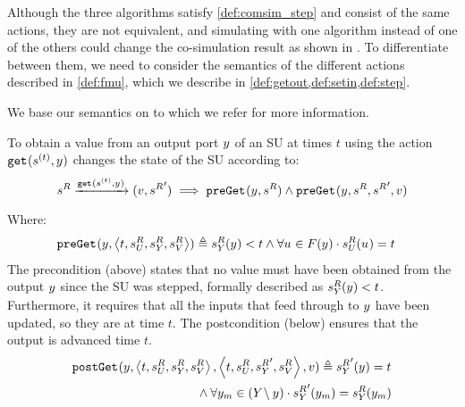 Although the three algorithms satisfy \cref{def:comsim_step} and consist of the same actions, they are not equivalent, and simulating with one algorithm instead of one of the others could change the co-simulation result as shown in \cite{Gomes2019c,hansen_verification_2021}. 
To differentiate between them, we need to consider the semantics of the different actions described in \cref{def:fmu}, which we describe in \cref{def:getout,def:setin,def:step}.

We base our semantics on \cite{Gomes2019a,hansen_verification_2021} to which we refer for more information.

\begin{definition}\label{def:getout}   
  To obtain a value from an output port $y_{}$ of an SU at times $t$ using the action $\mathtt{get}_{}(s_{}^{(t)},y_{})$ changes the state of the SU according to:
  \begin{align*}
    s^{R}_{} 
    \xrightarrow[\text{}]{\mathtt{get}_{}(s_{}^{(t)}, y_{})} 
    (v,{s^{R}_{}}')
    \implies 
    \mathtt{preGet}_{}(y_{}, s^{R}_{})
    \land
    \mathtt{preGet}_{}(y_{}, s^{R}_{}, {s^{R}_{}}', v)
  \end{align*}
  Where:
  \begin{align*}
    &\mathtt{preGet}_{}(y_{},  \left\langle t,s^{R}_{U_{}}, s^{R}_{Y_{}}, s^{R}_{V} \right\rangle ) \triangleq
    s^{R}_{Y_{}}(y_{}) < t \land
    \forall u_{} \in F(y_{}) \cdot s^{R}_{U_{}}(u_{}) = t 
  \end{align*}
  The precondition (above) states that no value must have been obtained from the output $y_{}$ since the SU was stepped, formally described as $s^{R}_{Y_{}}(y_{}) < t$.
  Furthermore, it requires that all the inputs that feed through to $y_{}$ have been updated, so they are at time $t$.
  The postcondition (below) ensures that the output is advanced time $t$.
  \begin{align*}
    &\mathtt{postGet}_{}(y_{},  \left\langle t,s^{R}_{U_{}}, s^{R}_{Y_{}}, s^{R}_{V} \right\rangle , 
     \left\langle t,s^{R}_{U_{}}, {s^{R}_{Y_{}}}', s^{R}_{V} \right\rangle , v) \triangleq 
    {s^{R}_{Y_{}}}'(y_{}) = t \nonumber \\
    & \qquad \qquad \qquad \qquad \qquad 
    \land 
    \forall y_{m} \in (Y_{} \setminus y_{}) \cdot 
    {s^{R}_{Y_{}}}'(y_{m}) =
    s^{R}_{Y_{}}(y_{m})
  \end{align*}
\end{definition}

